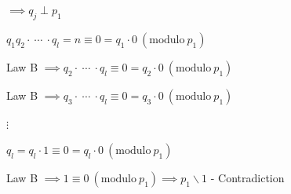 \documentclass{article}
\begin{document}
\( \implies q_j \perp p_1 \)

\( q_1q_2 \cdot\ \cdots\ \cdot q_l = n \equiv 0 = q_1 \cdot 0\ (\mathrm{modulo}\ p_1) \)

Law B \( \implies q_2 \cdot\ \cdots\ \cdot q_l \equiv 0 = q_2 \cdot 0\ (\mathrm{modulo}\ p_1) \)

Law B \( \implies q_3 \cdot\ \cdots\ \cdot q_l \equiv 0 = q_3 \cdot 0\ (\mathrm{modulo}\ p_1) \)

\( \vdots \)

\( q_l = q_l \cdot 1 \equiv 0 = q_l \cdot 0\ (\mathrm{modulo}\ p_1) \)

Law B \( \implies 1 \equiv 0\ (\mathrm{modulo}\ p_1) \implies p_1 \backslash 1 \) - Contradiction
\end{document}
